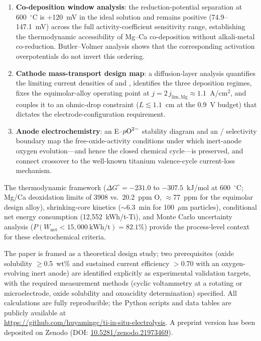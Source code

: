 \documentclass[11pt,a4paper]{article}
\begin{document}
\begin{enumerate}[itemsep=2pt,topsep=2pt]
  \item \textbf{Co-deposition window analysis}: the  reduction-potential separation at 600~$^{\circ}$C is +120~mV in the ideal solution and remains positive (74.9--147.1~mV) across the full activity-coefficient sensitivity range, establishing the thermodynamic accessibility of Mg--Ca co-deposition without alkali-metal co-reduction. Butler--Volmer analysis shows that the corresponding activation overpotentials do not invert this ordering.
  \item \textbf{Cathode mass-transport design map}: a diffusion-layer analysis quantifies the limiting current densities of  and , identifies the three deposition regimes, fixes the equimolar-alloy operating point at $j = 2\,j_{\mathrm{lim,Mg}} \approx 1.1$~A/cm$^2$, and couples it to an ohmic-drop constraint ($L \lesssim 1.1$~cm at the 0.9~V budget) that dictates the electrode-configuration requirement.
  \item \textbf{Anode electrochemistry}: an E--$p\ce{O^{2-}}$ stability diagram and an / selectivity boundary map the free-oxide-activity conditions under which inert-anode oxygen evolution---and hence the closed chemical cycle---is preserved, and connect  crossover to the well-known titanium valence-cycle current-loss mechanism.
\end{enumerate}

The thermodynamic framework ($\Delta G^{\circ} = -231.0$ to $-307.5$~kJ/mol at 600~$^{\circ}$C; Mg/Ca deoxidation limits of 3908 vs.\ 20.2~ppm O, $\approx$77~ppm for the equimolar design alloy), shrinking-core kinetics ($\sim$6.3~min for 100~$\mu$m particles), conditional net energy consumption (12{,}552~kWh/t-Ti), and Monte Carlo uncertainty analysis ($P(W_{\mathrm{net}}<15{,}000~\mathrm{kWh/t}) = 82.1\%$) provide the process-level context for these electrochemical criteria.

The paper is framed as a theoretical design study; two prerequisites (oxide solubility $\geq$0.5~wt\% and sustained current efficiency $>$0.70 with an oxygen-evolving inert anode) are identified explicitly as experimental validation targets, with the required measurement methods (cyclic voltammetry at a rotating or microelectrode, oxide solubility and oxoacidity determination) specified. All calculations are fully reproducible; the Python scripts and data tables are publicly available at\\ \url{https://github.com/huyamingc/ti-in-situ-electrolysis}. A preprint version has been deposited on Zenodo (DOI: \href{https://doi.org/10.5281/zenodo.21973469}{10.5281/zenodo.21973469}).
\end{document}
